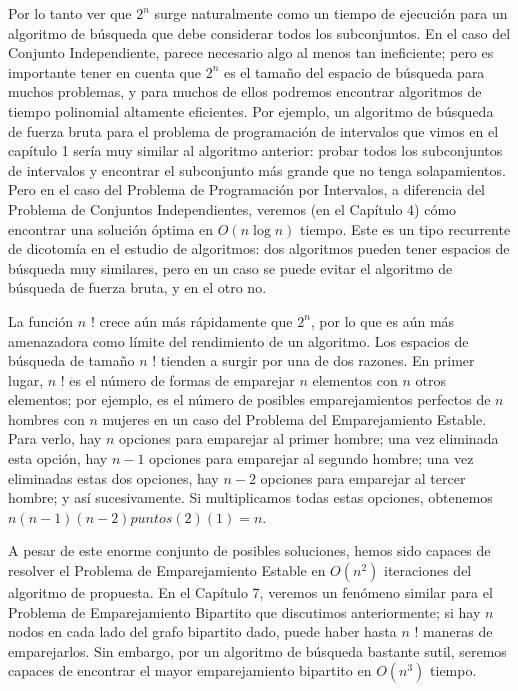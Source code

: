 \documentclass[a4paper, 12pt]{book}
\theoremstyle{dotless}
\begin{document}
Por lo tanto ver que $2^{n}$ surge naturalmente como un tiempo de ejecución para un algoritmo de búsqueda que debe considerar todos los subconjuntos. En el caso del Conjunto Independiente, parece necesario algo al menos tan ineficiente; pero es importante tener en cuenta que $2^{n}$ es el tamaño del espacio de búsqueda para muchos problemas, y para muchos de ellos podremos encontrar algoritmos de tiempo polinomial altamente eficientes. Por ejemplo, un algoritmo de búsqueda de fuerza bruta para el problema de programación de intervalos que vimos en el capítulo 1 sería muy similar al algoritmo anterior: probar todos los subconjuntos de intervalos y encontrar el subconjunto más grande que no tenga solapamientos. Pero en el caso del Problema de Programación por Intervalos, a diferencia del Problema de Conjuntos Independientes, veremos (en el Capítulo 4) cómo encontrar una solución óptima en $O(n \log n)$ tiempo. Este es un tipo recurrente de dicotomía en el estudio de algoritmos: dos algoritmos pueden tener espacios de búsqueda muy similares, pero en un caso se puede evitar el algoritmo de búsqueda de fuerza bruta, y en el otro no.

La función $n$ ! crece aún más rápidamente que $2^{n}$, por lo que es aún más amenazadora como límite del rendimiento de un algoritmo. Los espacios de búsqueda de tamaño $n$ ! tienden a surgir por una de dos razones. En primer lugar, $n$ ! es el número de formas de emparejar $n$ elementos con $n$ otros elementos; por ejemplo, es el número de posibles emparejamientos perfectos de $n$ hombres con $n$ mujeres en un caso del Problema del Emparejamiento Estable. Para verlo, hay $n$ opciones para emparejar al primer hombre; una vez eliminada esta opción, hay $n-1$ opciones para emparejar al segundo hombre; una vez eliminadas estas dos opciones, hay $n-2$ opciones para emparejar al tercer hombre; y así sucesivamente. Si multiplicamos todas estas opciones, obtenemos $n(n-1)(n-2) puntos(2)(1)=n$.

A pesar de este enorme conjunto de posibles soluciones, hemos sido capaces de resolver el Problema de Emparejamiento Estable en $O\left(n^{2}\right)$ iteraciones del algoritmo de propuesta. En el Capítulo 7, veremos un fenómeno similar para el Problema de Emparejamiento Bipartito que discutimos anteriormente; si hay $n$ nodos en cada lado del grafo bipartito dado, puede haber hasta $n$ ! maneras de emparejarlos. Sin embargo, por un algoritmo de búsqueda bastante sutil, seremos capaces de encontrar el mayor emparejamiento bipartito en $O\left(n^{3}\right)$ tiempo.
\end{document}
